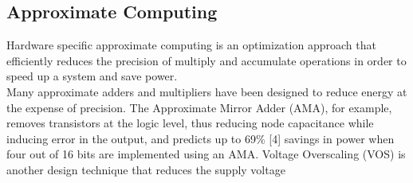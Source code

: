 \documentclass[conference]{IEEEtran}
\begin{document}
\subsection{Approximate Computing}
	Hardware specific approximate computing is an optimization approach that efficiently reduces the precision of multiply and accumulate operations in order to speed up a system and save power. \\
	\indent Many approximate adders and multipliers have been designed to reduce energy at the expense of precision. The Approximate Mirror Adder (AMA), for example, removes transistors at the logic level, thus reducing node capacitance while inducing error in the output, and predicts up to 69\% [4] savings in power when four out of 16 bits are implemented using an AMA. Voltage Overscaling (VOS) is another design technique that reduces the supply voltage 
	
	

%
%



%
%
\end{document}
